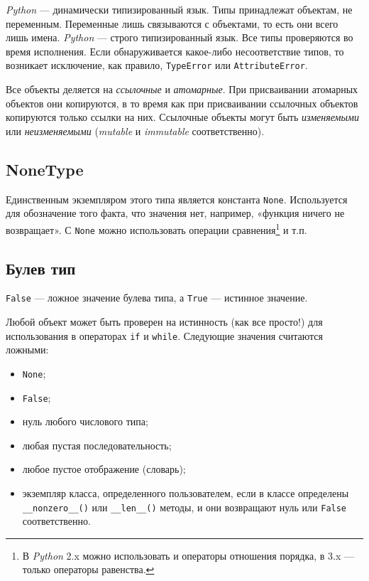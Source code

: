 \emph{Python} — динамически типизированный язык. Типы принадлежат объектам, не переменным. Переменные лишь связываются с объектами, то есть они всего лишь имена. \emph{Python} — строго типизированный язык. Все типы проверяются во время исполнения. Если обнаруживается какое-либо несоответствие типов, то возникает исключение, как правило, \lstinline{TypeError} или \lstinline{AttributeError}.

Все объекты деляется на \emph{ссылочные} и \emph{атомарные}. При присваивании атомарных объектов они копируются, в то время как при присваивании ссылочных объектов копируются только ссылки на них. Ссылочные объекты могут быть \emph{изменяемыми} или \emph{неизменяемыми} (\emph{mutable} и \emph{immutable} соответственно).

\subsection{NoneType}
Единственным экземпляром этого типа является константа \lstinline{None}. Используется для обозначение того факта, что значения нет, например, «функция ничего не возвращает». С \lstinline{None} можно использовать операции сравнения\footnote{В \emph{Python} 2.x можно использовать и операторы отношения порядка, в 3.x — только операторы равенства.} и т.п.

\subsection{Булев тип}
\lstinline{False} — ложное значение булева типа, а \lstinline{True} — истинное значение.

Любой объект может быть проверен на истинность (как все просто!) для использования в операторах \lstinline{if} и \lstinline{while}. Следующие значения считаются ложными:
\begin{itemize}
  \item \lstinline{None};
  \item \lstinline{False};
  \item нуль любого числового типа;
  \item любая пустая последовательность;
  \item любое пустое отображение (словарь);
  \item экземпляр класса, определенного пользователем, если в классе определены \lstinline{__nonzero__()} или \lstinline{__len__()} методы, и они возвращают нуль или \lstinline{False} соответственно.
\end{itemize}

